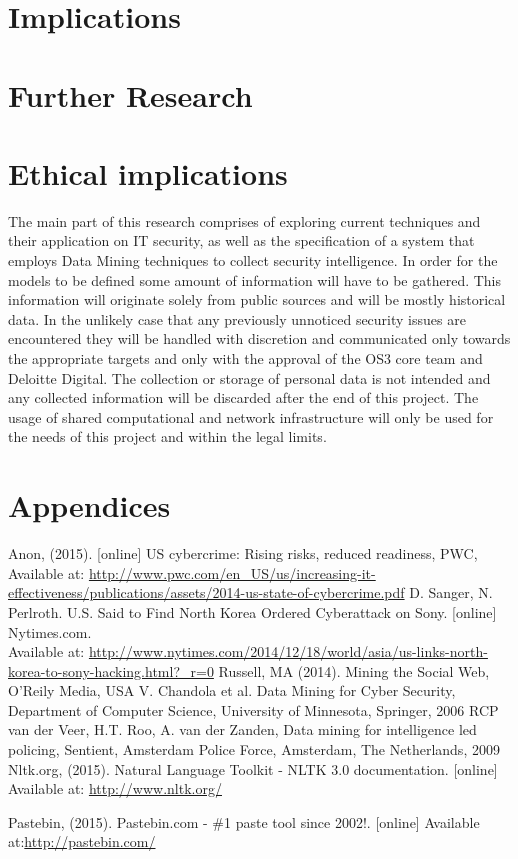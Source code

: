 \documentclass[12pt]{article}
\begin{document}
\section*{Implications}
\newpage
\section*{Further Research}
\newpage
\section*{Ethical implications}
The main part of this research comprises of exploring current techniques and their application on IT security, as well as the specification of a system that employs Data Mining techniques to collect security intelligence. In order for the models to be defined some amount of information will have to be gathered. This information will originate solely from public sources and will be mostly historical data. In the unlikely case that any previously unnoticed security issues are encountered they will be handled with discretion and communicated only towards the appropriate targets and only with the approval of the OS3 core team and Deloitte Digital. The collection or storage of personal data is not intended and any collected information will be discarded after the end of this project. The usage of shared computational and network infrastructure will only be used for the needs of this project and within the legal limits.
\newpage
\section*{Appendices}
\newpage

\begin{thebibliography}{99}
	Anon, (2015). [online] US cybercrime: Rising risks, reduced readiness, PWC, Available at: \url{http://www.pwc.com/en_US/us/increasing-it-effectiveness/publications/assets/2014-us-state-of-cybercrime.pdf}
	 D. Sanger, N. Perlroth.  U.S. Said to Find North Korea Ordered Cyberattack on Sony. [online] Nytimes.com. \\Available at: \url{http://www.nytimes.com/2014/12/18/world/asia/us-links-north-korea-to-sony-hacking.html?_r=0}
  Russell, MA (2014). Mining the Social Web, O'Reily Media, USA
    V. Chandola et al. Data Mining for Cyber Security, Department of Computer Science, University of Minnesota, Springer, 2006
   RCP van der Veer, H.T. Roo,  A. van der Zanden, Data mining for intelligence led policing, Sentient, Amsterdam Police Force, Amsterdam, The Netherlands, 2009
Nltk.org, (2015). Natural Language Toolkit - NLTK 3.0 documentation. [online] Available at: \url{http://www.nltk.org/}

Pastebin, (2015). Pastebin.com - \#1 paste tool since 2002!. [online] Available at:\url{http://pastebin.com/}

\end{thebibliography}
\end{document}
